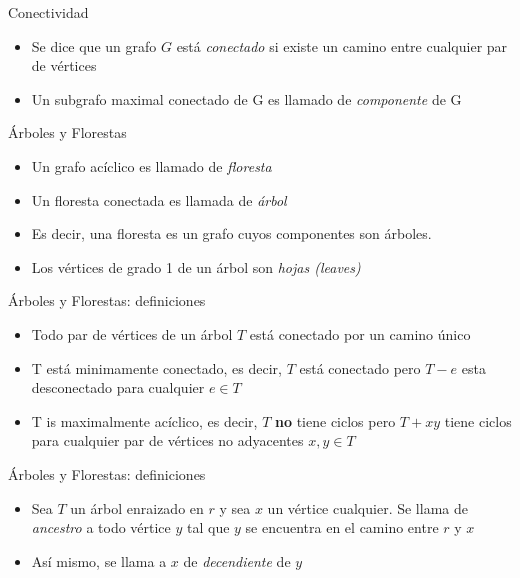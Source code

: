 \documentclass[]{beamer}
\begin{document}
\begin{frame}{Conectividad}
  \begin{itemize}
    \item Se dice que un grafo $G$ est\'a \textit{conectado} si existe un camino entre cualquier par de v\'ertices
      \pause
    \item Un subgrafo maximal conectado de G es llamado de \textit{componente} de G
  \end{itemize}
\end{frame}

\begin{frame}{\'Arboles y Florestas}
  \begin{itemize}
    \item Un grafo ac\'iclico es llamado de \textit{floresta}
      \pause
    \item Un floresta conectada es llamada de \textit{\'arbol}
      \pause
    \item Es decir, una floresta es un grafo cuyos componentes son \'arboles.
      \pause
    \item Los v\'ertices de grado 1 de un \'arbol son \textit{hojas (leaves)}
  \end{itemize}
\end{frame}

\begin{frame}{\'Arboles y Florestas: definiciones}
  \begin{itemize}
    \item Todo par de v\'ertices de un \'arbol $T$ est\'a conectado por un camino \'unico 
      \pause
    \item T est\'a minimamente conectado, es decir, $T$ est\'a conectado pero $T-e$ esta desconectado para cualquier $e\in T$
      \pause
    \item T is maximalmente ac\'iclico, es decir, $T$ \textbf{no} tiene ciclos pero $T + xy$ tiene ciclos para cualquier par de v\'ertices no adyacentes $x, y \in T$
  \end{itemize}
\end{frame}

\begin{frame}{\'Arboles y Florestas: definiciones}
  \begin{itemize}
    \item Sea $T$ un \'arbol enraizado en $r$ y sea $x$ un v\'ertice cualquier. Se llama de \textit{ancestro} a todo v\'ertice $y$ tal que $y$ se encuentra en el camino entre $r$ y $x$
      \pause
    \item As\'i mismo, se llama a $x$ de \textit{decendiente} de $y$
  \end{itemize}
\end{frame}
\end{document}
